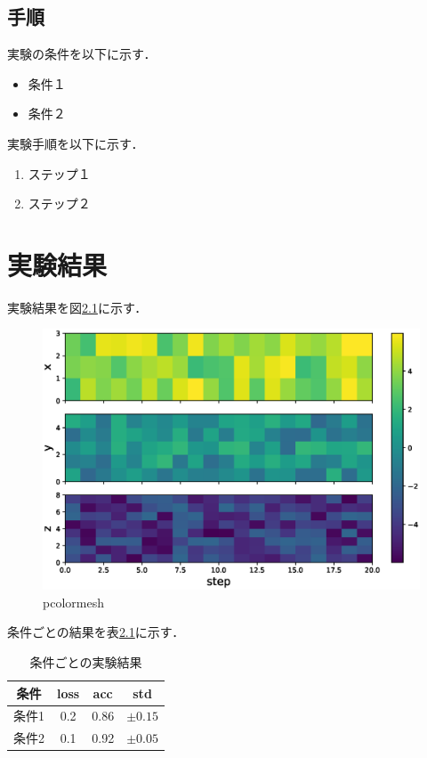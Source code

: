 \documentclass[a4paper, oneside, openany, dvipdfmx]{suribt}%
\newcommand{\fref}[1]{図\ref{#1}}
\newcommand{\tref}[1]{表\ref{#1}}
\begin{document}
\section{手順}
実験の条件を以下に示す．
\begin{itemize}
  \item 条件１
  \item 条件２
\end{itemize}

実験手順を以下に示す．

\begin{enumerate}
  \item ステップ１
  \item ステップ２
\end{enumerate}


\chapter{実験結果}

実験結果を\fref{fig:pcolormesh}に示す．
\begin{figure}[h]
  \centering
  \includegraphics[width=0.9\linewidth]{figs/pcolormesh.eps}
  \caption{pcolormesh}
  \label{fig:pcolormesh}
\end{figure}

条件ごとの結果を\tref{tb:result}に示す．
\begin{table}[htbp]
  \caption{条件ごとの実験結果}
  \label{tb:result}
  \centering\begin{tabular}{c|ccc}\hline
    条件 & loss & acc & std\\\hline
    条件1 & 0.2 & 0.86 & $\pm 0.15$\\\hline
    条件2 & 0.1 & 0.92 & $\pm 0.05$\\\hline
  \end{tabular}
\end{table}
\end{document}

